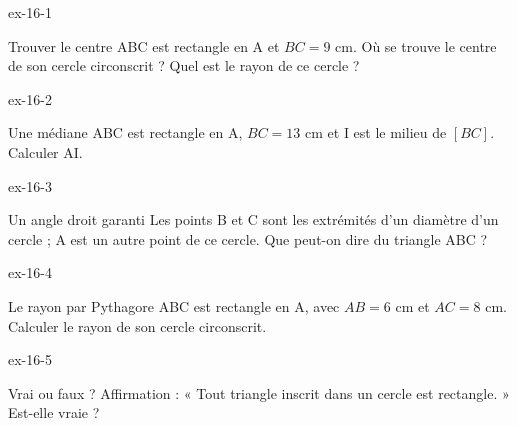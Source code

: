 \clearpage{}
\begin{blocLivre}{ex-16-1}\begin{exercice}[1]{Trouver le centre}
ABC est rectangle en A et $BC=9$ cm. Où se trouve le centre de son cercle circonscrit ? Quel est le rayon de ce cercle ?
\label{fig-ex-16-1}
\end{exercice}\end{blocLivre}
\begin{blocLivre}{ex-16-2}\begin{exercice}[1]{Une médiane}
ABC est rectangle en A, $BC=13$ cm et I est le milieu de $[BC]$. Calculer AI.
\label{fig-ex-16-2}
\end{exercice}\end{blocLivre}
\begin{blocLivre}{ex-16-3}\begin{exercice}[1]{Un angle droit garanti}
Les points B et C sont les extrémités d’un diamètre d’un cercle ; A est un autre point de ce cercle. Que peut-on dire du triangle ABC ?
\label{fig-ex-16-3}
\end{exercice}\end{blocLivre}
\begin{blocLivre}{ex-16-4}\begin{exercice}[1]{Le rayon par Pythagore}
ABC est rectangle en A, avec $AB=6$ cm et $AC=8$ cm. Calculer le rayon de son cercle circonscrit.
\label{fig-ex-16-4}
\end{exercice}\end{blocLivre}
\begin{blocLivre}{ex-16-5}\begin{exercice}[1]{Vrai ou faux ?}
Affirmation : « Tout triangle inscrit dans un cercle est rectangle. » Est-elle vraie ?
\label{fig-ex-16-5}
\end{exercice}\end{blocLivre}

